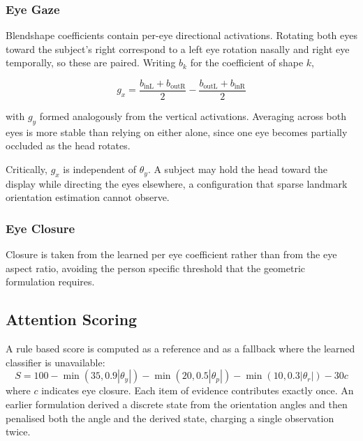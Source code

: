 \documentclass[conference]{IEEEtran}
\begin{document}
\subsubsection{Eye Gaze}

Blendshape coefficients contain per-eye directional activations. Rotating
both eyes toward the subject's right correspond to a left eye rotation
nasally and right eye temporally, so these are paired.
Writing $b_{k}$ for the coefficient of shape $k$,

\begin{equation}
g_{x} = \frac{b_{\mathrm{inL}} + b_{\mathrm{outR}}}{2} -
        \frac{b_{\mathrm{outL}} + b_{\mathrm{inR}}}{2}
\label{eq:gaze}
\end{equation}

with $g_{y}$ formed analogously from the vertical activations. Averaging
across both eyes is more stable than relying on either alone, since one eye
becomes partially occluded as the head rotates.

Critically, $g_{x}$ is independent of $\theta_{y}$. A subject may hold the
head toward the display while directing the eyes elsewhere, a
configuration that sparse landmark orientation estimation cannot observe.

\subsubsection{Eye Closure}

Closure is taken from the learned per eye coefficient rather than from the
eye aspect ratio, avoiding the person specific threshold that the geometric
formulation requires.

\subsection{Attention Scoring}

A rule based score is computed as a reference and as a fallback where the
learned classifier is unavailable:
\begin{equation}
S = 100 - \min(35, 0.9|\theta_{y}|) - \min(20, 0.5|\theta_{p}|)
        - \min(10, 0.3|\theta_{r}|) - 30 c
\label{eq:score}
\end{equation}
where $c$ indicates eye closure. Each item of evidence contributes exactly
once. An earlier formulation derived a discrete state from the orientation
angles and then penalised both the angle and the derived state, charging a
single observation twice.
\end{document}
